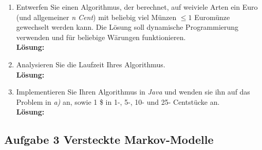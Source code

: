 \documentclass[11pt,a4paper,ngerman]{article}
\begin{document}
\begin{enumerate}[\bfseries (a)]



\item Entwerfen Sie einen Algorithmus, der berechnet, auf weiviele Arten ein Euro (und allgemeiner \emph{n Cent}) mit beliebig viel Münzen $\leq 1$ Euromünze gewechselt werden kann. Die Lösung soll dynamische Programmierung verwenden und für beliebige Wärungen funktionieren.\\

\textbf{Lösung:}


\item Analysieren Sie die Laufzeit Ihres Algorithmus.\\

\textbf{Lösung:}


\item Implementieren Sie Ihren Algorithmus in \emph{Java} und wenden sie ihn auf das Problem in \emph{a)} an, sowie 1 \$ in 1-, 5-, 10- und 25- Centstücke an.\\

\textbf{Lösung:}

\end{enumerate}


\subsection*{Aufgabe 3 \mdseries Versteckte Markov-Modelle}
\end{document}
